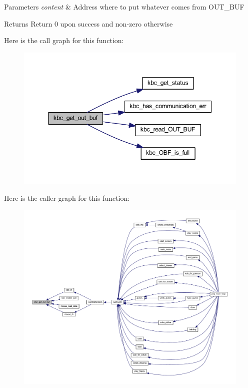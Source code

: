 \begin{DoxyParams}{Parameters}
{\em content} & Address where to put whatever comes from O\+U\+T\+\_\+\+B\+UF \\
\hline
\end{DoxyParams}
\begin{DoxyReturn}{Returns}
Return 0 upon success and non-\/zero otherwise 
\end{DoxyReturn}
Here is the call graph for this function\+:\nopagebreak
\begin{figure}[H]
\begin{center}
\leavevmode
\includegraphics[width=345pt]{group__keyboard_gaa7f7b14e556eec81eb7b4eae1d63ec85_cgraph}
\end{center}
\end{figure}
Here is the caller graph for this function\+:\nopagebreak
\begin{figure}[H]
\begin{center}
\leavevmode
\includegraphics[width=350pt]{group__keyboard_gaa7f7b14e556eec81eb7b4eae1d63ec85_icgraph}
\end{center}
\end{figure}
\mbox{\label{group__keyboard_ga54c1dc87fd33a133b8c1eaf08bc51a99}} 
